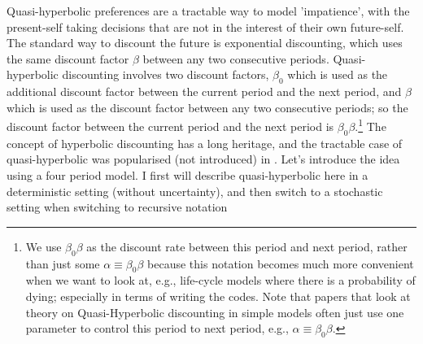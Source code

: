 \label{app:QuasiHyperbolic}
Quasi-hyperbolic preferences are a tractable way to model 'impatience', with the present-self taking decisions that are not in the interest of their own future-self. The standard way to discount the future is exponential discounting, which uses the same discount factor $\beta$ between any two consecutive periods. Quasi-hyperbolic discounting involves two discount factors, $\beta_0$ which is used as the additional discount factor between the current period and the next period, and $\beta$ which is used as the discount factor between any two consecutive periods; so the discount factor between the current period and the next period is $\beta_0 \beta$.\footnote{We use $\beta_0 \beta$ as the discount rate between this period and next period, rather than just some $\alpha \equiv \beta_0 \beta$ because this notation becomes much more convenient when we want to look at, e.g., life-cycle models where there is a probability of dying; especially in terms of writing the codes. Note that papers that look at theory on Quasi-Hyperbolic discounting in simple models often just use one parameter to control this period to next period, e.g., $\alpha \equiv \beta_0 \beta$.} The concept of hyperbolic discounting has a long heritage, and the tractable case of quasi-hyperbolic was popularised (not introduced) in \cite*{Laibson1997}. Let's introduce the idea using a four period model. I first will describe quasi-hyperbolic here in a deterministic setting (without uncertainty), and then switch to a stochastic setting when switching to recursive notation

